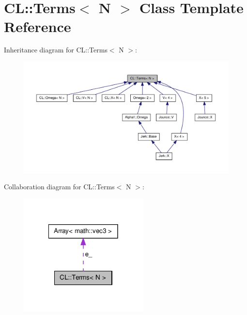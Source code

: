 \hypertarget{classCL_1_1Terms}{\section{\-C\-L\-:\-:\-Terms$<$ \-N $>$ \-Class \-Template \-Reference}
\label{classCL_1_1Terms}
}


\-Inheritance diagram for \-C\-L\-:\-:\-Terms$<$ \-N $>$\-:\nopagebreak
\begin{figure}[H]
\begin{center}
\leavevmode
\includegraphics[width=350pt]{classCL_1_1Terms__inherit__graph}
\end{center}
\end{figure}


\-Collaboration diagram for \-C\-L\-:\-:\-Terms$<$ \-N $>$\-:\nopagebreak
\begin{figure}[H]
\begin{center}
\leavevmode
\includegraphics[width=186pt]{classCL_1_1Terms__coll__graph}
\end{center}
\end{figure}
